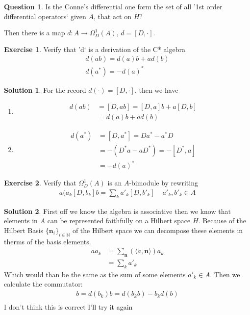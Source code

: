 \documentclass[a4paper]{article}
\theoremstyle{definition}
\theoremstyle{definition}
\newtheorem{question}{Question}
\theoremstyle{definition}
\theoremstyle{theorem}
\theoremstyle{theorem}
\theoremstyle{theorem}
\newtheorem{exercise}{Exercise}
\theoremstyle{definition}
\newtheorem{solution}{Solution}
\begin{document}
\begin{question}
    Is the Conne's differential one form  the set of all '1st order
    differential operators` given $A$, that act on $H$?
\end{question}
Then there is a map $d:A\rightarrow \Omega _D ^1 (A)$, $d = [D, \cdot]$.
\begin{exercise}
    Verify that 'd` is a derivation of the C* algebra
    \begin{align*}
        d(ab) = d(a)b + ad(b) \\
        d(a^*) = -d(a)^*
    \end{align*}
\end{exercise}
\begin{solution}
    For the record $d(\cdot) = [D, \cdot]$, then we have
    \begin{enumerate}
        \item
            \begin{align*}
                d(ab) &= [D, ab] = [D, a]b + a[D,b]\\
                &= d(a)b + ad(b)
            \end{align*}
        \item
            \begin{align*}
                d(a^*) &= [D, a^*] = Da^* - a^*D \\
                &=-(D^*a - aD^*) = -[D^*, a] \\
                &= -d(a)^*
            \end{align*}
    \end{enumerate}
\end{solution}
\begin{exercise}
    Verify that $\Omega _D^1 (A)$ is an $A$-bimodule by rewriting
    \begin{align*}
        a(a_k[D, b_k]b = \sum_k a'_k[D, b'_k] \;\;\;\; a'_k, b'_k \in A
    \end{align*}
\end{exercise}
\begin{solution}
    First off we know the algebra is associative then we know that elements
    in $A$ can be represented faithfully on a Hilbert space $H$. Because of
    the Hilbert Basis $\{\textbf{n}_i\}_{i\in \mathbb{N}}$ of the Hilbert space we can decompose these elements
    in therms of the basis elements.
    \begin{align*}
        aa_k &= \sum _{\textbf{n}}(\langle a, \textbf{n} \rangle) a_k \\
        &= \sum _{k} a'_{k}
    \end{align*}
    Which would than be the same as the sum of some elements
    $a'_{k} \in A$. Then we calculate the commutator:
    \begin{align*}
        [D, b_k] b = d(b_k)b = d(b_kb) - b_kd(b)\\
    \end{align*}
I don't think this is correct I'll try it again
\end{solution}
\end{document}
